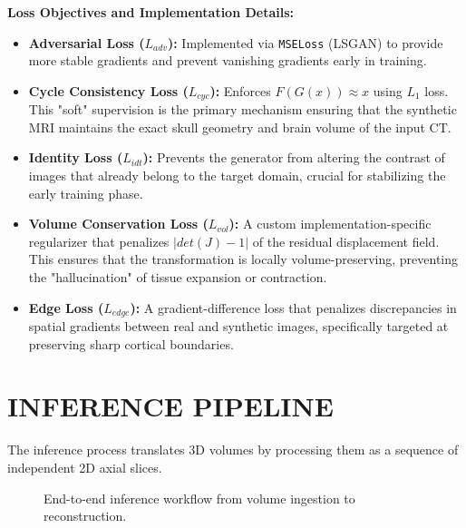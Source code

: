 \documentclass[10pt,a4paper]{article}
\begin{document}
\textbf{Loss Objectives and Implementation Details:}
\begin{itemize}
    \item \textbf{Adversarial Loss ($L_{adv}$):} Implemented via \texttt{MSELoss} (LSGAN) to provide more stable gradients and prevent vanishing gradients early in training.
    \item \textbf{Cycle Consistency Loss ($L_{cyc}$):} Enforces $F(G(x)) \approx x$ using $L_1$ loss. This "soft" supervision is the primary mechanism ensuring that the synthetic MRI maintains the exact skull geometry and brain volume of the input CT.
    \item \textbf{Identity Loss ($L_{idt}$):} Prevents the generator from altering the contrast of images that already belong to the target domain, crucial for stabilizing the early training phase.
    \item \textbf{Volume Conservation Loss ($L_{vol}$):} A custom implementation-specific regularizer that penalizes $|det(J) - 1|$ of the residual displacement field. This ensures that the transformation is locally volume-preserving, preventing the "hallucination" of tissue expansion or contraction.
    \item \textbf{Edge Loss ($L_{edge}$):} A gradient-difference loss that penalizes discrepancies in spatial gradients between real and synthetic images, specifically targeted at preserving sharp cortical boundaries.
\end{itemize}

\section{INFERENCE PIPELINE}
The inference process translates 3D volumes by processing them as a sequence of independent 2D axial slices.

\begin{figure}[H]
\centering
{}
\caption{End-to-end inference workflow from volume ingestion to reconstruction.}
\end{figure}
\end{document}
